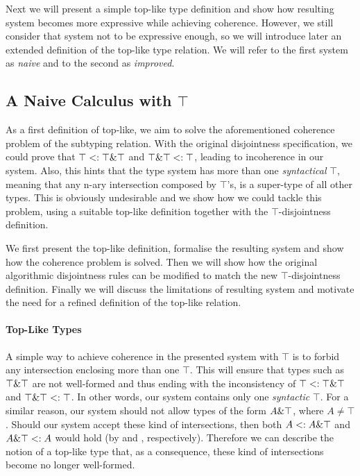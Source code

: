 Next we will present a simple top-like type definition and show how resulting system
becomes more expressive while achieving coherence.
However, we still consider that system not to be expressive enough, 
so we will introduce later an extended definition of the top-like type relation.
We will refer to the first system as \emph{naive} and to the second as \emph{improved}. 

\subsection{A Naive Calculus with $\top$}

As a first definition of top-like, we aim to solve the aforementioned coherence problem of the subtyping relation.
With the original disjointness specification, we could prove that $\top <: \top \& \top$ and $\top \& \top <: \top$, leading to incoherence in our system. 
Also, this hints that the type system has more than one \emph{syntactical} $\top$,
meaning that any n-ary intersection composed by $\top$'s, is a super-type of all other
types.
This is obviously undesirable and we show how we could tackle this problem, using a
suitable top-like definition together with the $\top$-disjointness definition.

We first present the top-like definition, formalise the resulting system and  
show how the coherence problem is solved.
Then we will show how the original algorithmic disjointness rules can be modified to match the new $\top$-disjointness
definition.
Finally we will discuss the limitations of resulting system and motivate the need for a refined definition of the top-like 
relation. 

\paragraph{Top-Like Types}

A simple way to achieve coherence in the presented system with $\top$ is to forbid any intersection enclosing 
more than one $\top$.
This will ensure that types such as $\top \& \top$ are not well-formed and thus ending with the inconsistency of
$\top <: \top \& \top$ and $\top \& \top <: \top$.
In other words, our system contains only one \emph{syntactic} $\top$. 
For a similar reason, our system should not allow types of the form $A \& \top$, where $A \neq \top$.  
Should our system accept these kind of intersections, then both $A <: A \& \top$ and 
$A \& \top <: A$ would hold (by  and , respectively).
Therefore we can describe the notion of a top-like type that, as a consequence, these kind of intersections become no longer well-formed.

